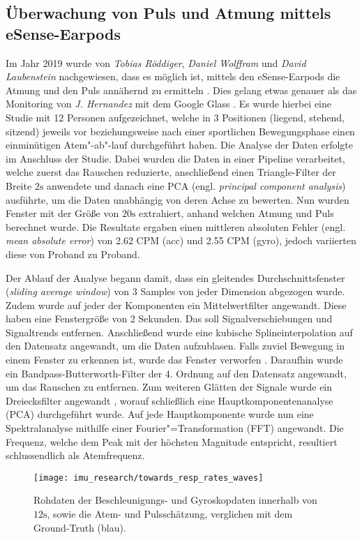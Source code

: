 \subsection{Überwachung von Puls und Atmung mittels eSense-Earpods}
Im Jahr 2019 wurde von \textit{Tobias Röddiger}, \textit{Daniel Wolffram} und \textit{David Laubenstein} nachgewiesen, dass es möglich ist, mittels den eSense-Earpods die Atmung und den Puls annähernd zu ermitteln \cite{roddigerRespirationRateMonitoring2019}. 
Dies gelang etwas genauer als das Monitoring von \textit{J. Hernandez} mit dem Google Glass \cite{hernandezCardiacRespiratoryParameter}.
Es wurde hierbei eine Studie mit 12 Personen aufgezeichnet, welche in 3 Positionen (liegend, stehend, sitzend) jeweils vor beziehungsweise nach einer sportlichen Bewegungsphase einen einminütigen Atem"-ab"-lauf durchgeführt haben. 
Die Analyse der Daten erfolgte im Anschluss der Studie.
Dabei wurden die Daten in einer Pipeline verarbeitet, welche zuerst das Rauschen reduzierte, anschließend einen Triangle-Filter der Breite $2\si{\s}$ anwendete und danach eine PCA (engl. \textit{principal component analysis}) ausführte, um die Daten unabhängig von deren Achse zu bewerten.
Nun wurden Fenster mit der Größe von $20\si{\s}$ extrahiert, anhand welchen Atmung und Puls berechnet wurde.
Die Resultate ergaben einen mittleren absoluten Fehler (engl. \textit{mean absolute error}) von 2.62 CPM (acc) und 2.55 CPM (gyro), jedoch variierten diese von Proband zu Proband.

Der Ablauf der Analyse begann damit, dass ein gleitendes Durchschnittsfenster (\textit{sliding average window}) von 3 Samples von jeder Dimension abgezogen wurde. 
Zudem wurde auf jeder der Komponenten ein Mittelwertfilter angewandt. 
Diese haben eine Fenstergröße von 2 Sekunden. 
Das soll Signalverschiebungen und Signaltrends entfernen.
Anschließend wurde eine kubische Splineinterpolation auf den Datensatz angewandt, um die Daten aufzublasen.
Falls zuviel Bewegung in einem Fenster zu erkennen ist, wurde das Fenster verworfen \cite{sunSleepMonitorMonitoringRespiratory2017}.
Daraufhin wurde ein Bandpass-Butterworth-Filter der 4. Ordnung auf den Datensatz angewandt, um das Rauschen zu entfernen.
Zum weiteren Glätten der Signale wurde ein Dreiecksfilter angewandt \cite{haotianMindfulWatch2017}, worauf schließlich eine Hauptkomponentenanalyse (PCA) durchgeführt wurde.
Auf jede Hauptkomponente wurde nun eine Spektralanalyse mithilfe einer Fourier"=Transformation (FFT) angewandt. 
Die Frequenz, welche dem Peak mit der höchsten Magnitude entspricht, resultiert schlussendlich als Atemfrequenz.

\begin{figure}[ht]
    \texttt{[image: imu\_research/towards\_resp\_rates\_waves]}
    \caption{Rohdaten der Beschleunigungs- und Gyroskopdaten innerhalb von $12 \si{\s}$, sowie die Atem- und Pulsschätzung, verglichen mit dem Ground-Truth (blau).}
    \label{background:towards_resp_esense:results}
\end{figure}